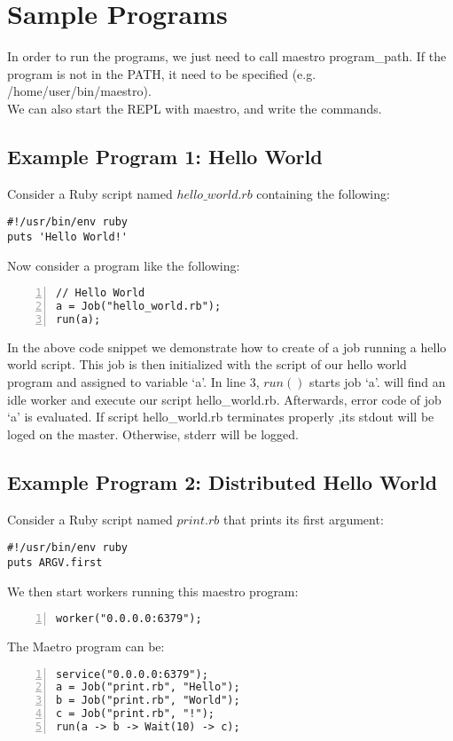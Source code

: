 \section{Sample Programs}
\label{sect:samples}
In order to run the programs, we just need to call maestro program\_path. If the \lang{} 
program is not in the PATH, it need to be specified (e.g. /home/user/bin/maestro).\\
We can also start the REPL with maestro, and write the commands.

\subsection*{Example Program 1: Hello World}
Consider a Ruby script named $hello\_world.rb$ containing the following:
\begin{verbatim}
#!/usr/bin/env ruby
puts 'Hello World!'
\end{verbatim}
Now consider a \lang{} program like the following:
\begin{Verbatim}[numbers=left]
// Hello World
a = Job("hello_world.rb");
run(a);
\end{Verbatim}

In the above code snippet we demonstrate how to create of a job running a
hello world script.
This job is then initialized with the script of our hello world program and
assigned to variable `a'. In line 3, $run()$ starts job `a'. 
\lang{} will find an idle worker and execute our script hello\_world.rb.
Afterwards, error code of job `a' is evaluated. If script hello\_world.rb terminates properly
,its stdout will be loged on the master. Otherwise, stderr will be logged.

\subsection*{Example Program 2: Distributed Hello World}
Consider a Ruby script named $print.rb$ that prints its first argument:
\begin{verbatim}
#!/usr/bin/env ruby
puts ARGV.first
\end{verbatim}
We then start workers running this maestro program:
\begin{Verbatim}[numbers=left]
worker("0.0.0.0:6379");
\end{Verbatim}
The Maetro program can be:
\begin{Verbatim}[numbers=left]
service("0.0.0.0:6379");
a = Job("print.rb", "Hello");
b = Job("print.rb", "World");
c = Job("print.rb", "!");
run(a -> b -> Wait(10) -> c);
\end{Verbatim}

